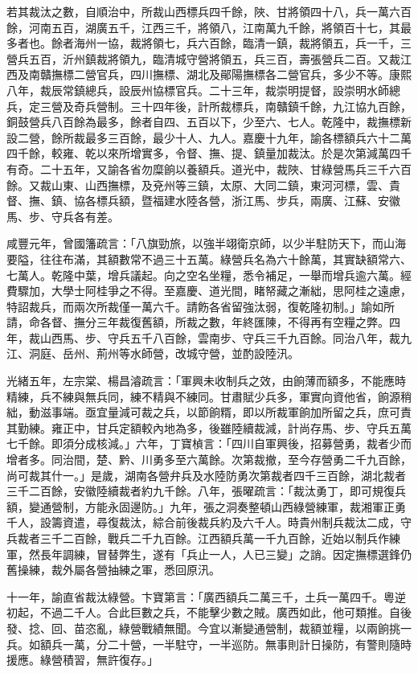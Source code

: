 \begin{pinyinscope}
若其裁汰之數，自順治中，所裁山西標兵四千餘，陜、甘將領四十八，兵一萬六百餘，河南五百，湖廣五千，江西三千，將領八，江南萬九千餘，將領百十七，其最多者也。餘者海州一協，裁將領七，兵六百餘，臨清一鎮，裁將領五，兵一千，三營兵五百，沂州鎮裁將領九，臨清城守營將領五，兵三百，壽張營兵二百。又裁江西及南贛撫標二營官兵，四川撫標、湖北及鄖陽撫標各二營官兵，多少不等。康熙八年，裁辰常鎮總兵，設辰州協標官兵。二十三年，裁崇明提督，設崇明水師總兵，定三營及奇兵營制。三十四年後，計所裁標兵，南贛鎮千餘，九江協九百餘，銅鼓營兵八百餘為最多，餘者自四、五百以下，少至六、七人。乾隆中，裁撫標新設二營，餘所裁最多三百餘，最少十人、九人。嘉慶十九年，諭各標額兵六十二萬四千餘，較雍、乾以來所增實多，令督、撫、提、鎮量加裁汰。於是次第減萬四千有奇。二十五年，又諭各省勿糜餉以養額兵。道光中，裁陜、甘綠營馬兵三千六百餘。又裁山東、山西撫標，及兗州等三鎮，太原、大同二鎮，東河河標，雲、貴督、撫、鎮、協各標兵額，暨福建水陸各營，浙江馬、步兵，兩廣、江蘇、安徽馬、步、守兵各有差。

咸豐元年，曾國籓疏言：「八旗勁旅，以強半翊衛京師，以少半駐防天下，而山海要隘，往往布滿，其額數常不過三十五萬。綠營兵名為六十餘萬，其實缺額常六、七萬人。乾隆中葉，增兵議起。向之空名坐糧，悉令補足，一舉而增兵逾六萬。經費驟加，大學士阿桂爭之不得。至嘉慶、道光間，睹帑藏之漸絀，思阿桂之遠慮，特詔裁兵，而兩次所裁僅一萬六千。請飭各省留強汰弱，復乾隆初制。」諭如所請，命各督、撫分三年裁復舊額，所裁之數，年終匯陳，不得再有空糧之弊。四年，裁山西馬、步、守兵五千八百餘，雲南步、守兵三千九百餘。同治八年，裁九江、洞庭、岳州、荊州等水師營，改城守營，並酌設陸汛。

光緒五年，左宗棠、楊昌濬疏言：「軍興未收制兵之效，由餉薄而額多，不能應時精練，兵不練與無兵同，練不精與不練同。甘肅賦少兵多，軍實向資他省，餉源稍絀，動滋事端。亟宜量減可裁之兵，以節餉糈，即以所裁軍餉加所留之兵，庶可責其勤練。雍正中，甘兵定額較內地為多，後雖陸續裁減，計尚存馬、步、守兵五萬七千餘。即須分成核減。」六年，丁寶楨言：「四川自軍興後，招募營勇，裁者少而增者多。同治間，楚、黔、川勇多至六萬餘。次第裁撤，至今存營勇二千九百餘，尚可裁其什一。」是歲，湖南各營弁兵及水陸防勇次第裁者四千三百餘，湖北裁者三千二百餘，安徽陸續裁者約九千餘。八年，張曜疏言：「裁汰勇丁，即可規復兵額，變通營制，方能永固邊防。」九年，張之洞奏整頓山西綠營練軍，裁湘軍正勇千人，設籌資遣，尋復裁汰，綜合前後裁兵約及六千人。時貴州制兵裁汰二成，守兵裁者三千二百餘，戰兵二千九百餘。江西額兵萬一千九百餘，近始以制兵作練軍，然長年調練，冒替弊生，遂有「兵止一人，人已三變」之誚。因定撫標選鋒仍舊操練，裁外屬各營抽練之軍，悉回原汛。

十一年，諭直省裁汰綠營。卞寶第言：「廣西額兵二萬三千，土兵一萬四千。粵逆初起，不過二千人。合此巨數之兵，不能擊少數之賊。廣西如此，他可類推。自後發、捻、回、苗恣亂，綠營戰績無聞。今宜以漸變通營制，裁額並糧，以兩餉挑一兵。如額兵一萬，分二十營，一半駐守，一半巡防。無事則計日操防，有警則隨時援應。綠營積習，無許復存。」


\end{pinyinscope}
